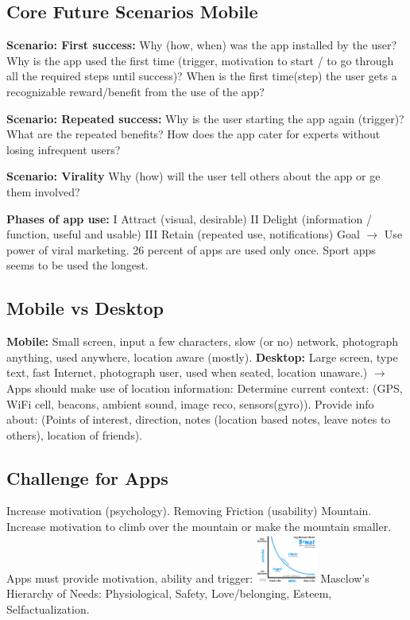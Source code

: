 \subsection{Core Future Scenarios Mobile}
\textbf{Scenario: First success:} 
Why (how, when) was the app installed by the user?
Why is the app used the first time (trigger, motivation to start / to go through all the required steps until success)? 
When is the first time(step) the user gets a recognizable reward/benefit from the use of the app?

\textbf{Scenario: Repeated success:}
Why is the user starting the app again (trigger)?
What are the repeated benefits?
How does the app cater for experts without losing infrequent users?

\textbf{Scenario: Virality}
Why (how) will the user tell others about the app or ge them involved?

\textbf{Phases of app use:} I Attract (visual, desirable) II Delight (information / function, useful and usable) III Retain (repeated use, notifications)
Goal $\rightarrow$ Use power of viral marketing. 26 percent of apps are used only once. Sport apps seems to be used the longest.

\subsection{Mobile vs Desktop}
\textbf{Mobile:} Small screen, input a few characters, slow (or no) network, photograph anything, used anywhere, location aware (mostly).
\textbf{Desktop:} Large screen, type text, fast Internet, photograph user, used when seated, location unaware.) 
$\rightarrow$ Apps should make use of location information: Determine current context: (GPS, WiFi cell, beacons, ambient sound, image reco, sensors(gyro)). Provide info about: (Points of interest, direction, notes (location based notes, leave notes to others), location of friends).

\subsection{Challenge for Apps}
Increase motivation (psychology). Removing Friction (usability) Mountain.
Increase motivation to climb over the mountain or make the mountain smaller.
Apps must provide motivation, ability and trigger:
\includegraphics[width=0.15\textwidth]{challenge.png}
Masclow's Hierarchy of Needs: Physiological, Safety, Love/belonging, Esteem, Selfactualization.

